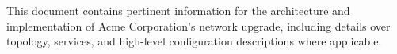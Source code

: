 This document contains pertinent information for the architecture and
implementation of Acme Corporation's network upgrade, including details over 
topology, services, and high-level configuration descriptions where applicable.
